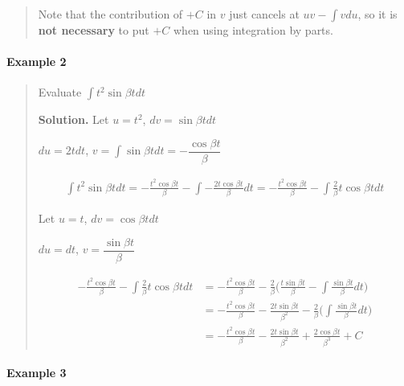 \documentclass[
]{article}
\begin{document}
\begin{quote}
Note that the contribution of \(+C\) in \(v\) just cancels at
\(uv - \int vdu\), so it is \textbf{not necessary} to put \(+C\) when
using integration by parts.
\end{quote}

\hypertarget{example-2-5}{%
\paragraph*{Example 2}\label{example-2-5}}

\begin{quote}
Evaluate \(\displaystyle \int t^2 \sin {\beta t} dt\)

\textbf{Solution.} Let \(u = t^2\), \(dv = \sin {\beta t} dt\)

\(du = 2tdt\),
\(v = \int \sin {\beta t} dt = -\dfrac{\cos {\beta t}}{\beta}\)

\begin{align*}
\int t^2 \sin \beta t dt  = -\frac{t^2\cos{\beta t}}{\beta} - \int -\frac{2t\cos{\beta t}}{\beta}dt
= -\frac{t^2\cos{\beta t}}{\beta} - \int \frac{2}{\beta} t \cos{\beta t}dt
\end{align*}

Let \(u = t\), \(dv = \cos{\beta t}dt\)

\(du = dt\), \(v = \dfrac{\sin{\beta t}}{{\beta}}\)

\begin{align*}
-\frac{t^2\cos{\beta t}}{\beta} - \int \frac{2}{\beta} t\cos{\beta t}dt &= -\frac{t^2\cos{\beta t}}{\beta} - \frac{2}{\beta}\Big(\frac{t \sin{\beta t}}{{\beta}} - \int \frac{\sin{\beta t}}{{\beta}}dt\Big)\\
&= -\frac{t^2\cos{\beta t}}{\beta} - \frac{2t \sin{\beta t}}{\beta^2} - \frac{2}{\beta} \Big(\int \frac{\sin{\beta t}}{\beta} dt\Big)\\
&= -\frac{t^2\cos{\beta t}}{\beta} - \frac{2t \sin{\beta t}}{\beta^2} + \frac{2\cos {\beta t}}{\beta^3} + C
\end{align*}
\end{quote}

\hypertarget{example-3-4}{%
\paragraph*{Example 3}\label{example-3-4}}
\end{document}
